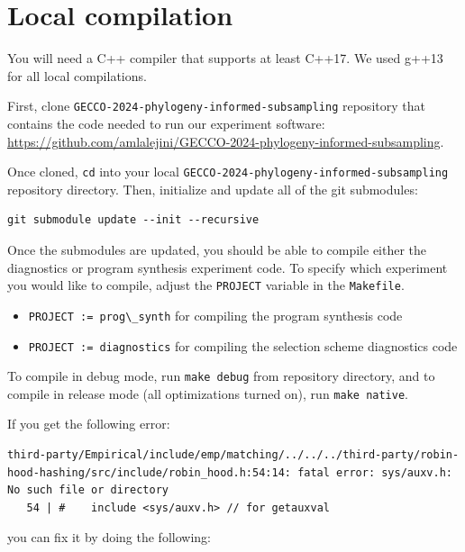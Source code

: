 \documentclass[
]{book}
\newcommand{\passthrough}[1]{#1}
\providecommand{\tightlist}{%
  \setlength{\itemsep}{0pt}\setlength{\parskip}{0pt}}
\begin{document}
\hypertarget{local-compilation}{%
\chapter{Local compilation}\label{local-compilation}}

You will need a C++ compiler that supports at least C++17.
We used g++13 for all local compilations.

First, clone \passthrough{\lstinline!GECCO-2024-phylogeny-informed-subsampling!} repository that contains the code needed to run our experiment software: \url{https://github.com/amlalejini/GECCO-2024-phylogeny-informed-subsampling}.

Once cloned, \passthrough{\lstinline!cd!} into your local \passthrough{\lstinline!GECCO-2024-phylogeny-informed-subsampling!} repository directory.
Then, initialize and update all of the git submodules:

\begin{lstlisting}
git submodule update --init --recursive
\end{lstlisting}

Once the submodules are updated, you should be able to compile either the diagnostics or program synthesis experiment code.
To specify which experiment you would like to compile, adjust the \passthrough{\lstinline!PROJECT!} variable in the \passthrough{\lstinline!Makefile!}.

\begin{itemize}
\tightlist
\item
  \passthrough{\lstinline!PROJECT := prog\_synth!} for compiling the program synthesis code
\item
  \passthrough{\lstinline!PROJECT := diagnostics!} for compiling the selection scheme diagnostics code
\end{itemize}

To compile in debug mode, run \passthrough{\lstinline!make debug!} from repository directory, and to compile in release mode (all optimizations turned on), run \passthrough{\lstinline!make native!}.

If you get the following error:

\begin{lstlisting}
third-party/Empirical/include/emp/matching/../../../third-party/robin-hood-hashing/src/include/robin_hood.h:54:14: fatal error: sys/auxv.h: No such file or directory
   54 | #    include <sys/auxv.h> // for getauxval
\end{lstlisting}

you can fix it by doing the following:
\end{document}
